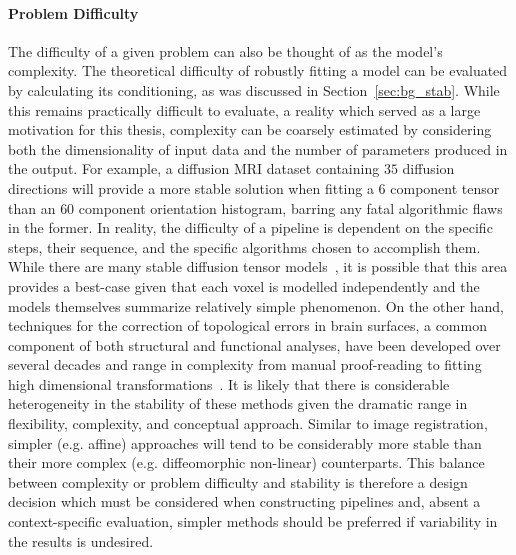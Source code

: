 \paragraph*{Problem Difficulty}
The difficulty of a given problem can also be thought of as the model's complexity. The theoretical difficulty of
robustly fitting a model can be evaluated by calculating its conditioning, as was discussed in
Section~\ref{sec:bg_stab}. While this remains practically difficult to evaluate, a reality which served as a large
motivation for this thesis, complexity can be coarsely estimated by considering both the dimensionality of input
data and the number of parameters produced in the output. For example, a diffusion MRI dataset containing $35$
diffusion directions will provide a more stable solution when fitting a $6$ component tensor than an $60$ component
orientation histogram, barring any fatal algorithmic flaws in the former. In reality, the difficulty of a pipeline
is dependent on the specific steps, their sequence, and the specific algorithms chosen to accomplish them. While
there are many stable diffusion tensor models~\cite{skare2000condition}, it is possible that this area provides a
best-case given that each voxel is modelled independently and the models themselves summarize relatively simple
phenomenon. On the other hand, techniques for the correction of topological errors in brain surfaces, a common
component of both structural and functional analyses, have been developed over several decades and range in
complexity from manual proof-reading to fitting high dimensional transformations~\cite{yotter2011topological}. It
is likely that there is considerable heterogeneity in the stability of these methods given the dramatic range in
flexibility, complexity, and conceptual approach. Similar to image registration, simpler (e.g. affine) approaches
will tend to be considerably more stable than their more complex (e.g. diffeomorphic non-linear) counterparts.
This balance between complexity or problem difficulty and stability is therefore a design decision which must be
considered when constructing pipelines and, absent a context-specific evaluation, simpler methods should be
preferred if variability in the results is undesired.


